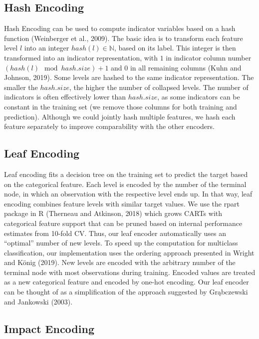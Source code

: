 \documentclass[smallextended]{svjour3}       %
\begin{document}
\hypertarget{hash-encoding}{%
\subsection{Hash Encoding}\label{hash-encoding}}

Hash Encoding can be used to compute indicator variables based on a hash function (Weinberger et al., 2009).
The basic idea is to transform each feature level \(l\) into an integer \(hash(l) \in \mathbb{N}\), based on its label.
This integer is then transformed into an indicator representation, with \(1\) in indicator column number \((hash(l) \mod hash.size) + 1\) and \(0\) in all remaining columns (Kuhn and Johnson, 2019).
Some levels are hashed to the same indicator representation.
The smaller the \(hash.size\), the higher the number of collapsed levels.
The number of indicators is often effectively lower than \(hash.size\), as some indicators can be constant in the training set (we remove those columns for both training and prediction).
Although we could jointly hash multiple features, we hash each feature separately to improve comparability with the other encoders.

\hypertarget{leaf-encoding}{%
\subsection{Leaf Encoding}\label{leaf-encoding}}

Leaf encoding fits a decision tree on the training set to predict the target based on the categorical feature.
Each level is encoded by the number of the terminal node, in which an observation with the respective level ends up.
In that way, leaf encoding combines feature levels with similar target values.
We use the rpart package in R (Therneau and Atkinson, 2018) which grows CARTs with categorical feature support that can be pruned based on internal performance estimates from 10-fold CV.
Thus, our leaf encoder automatically uses an ``optimal'' number of new levels.
To speed up the computation for multiclass classification, our implementation uses the ordering approach presented in Wright and König (2019).
New levels are encoded with the arbitrary number of the terminal node with most observations during training.
Encoded values are treated as a new categorical feature and encoded by one-hot encoding.
Our leaf encoder can be thought of as a simplification of the approach suggested by Grąbczewski and Jankowski (2003).

\hypertarget{impact-encoding}{%
\subsection{Impact Encoding}\label{impact-encoding}}
\end{document}

